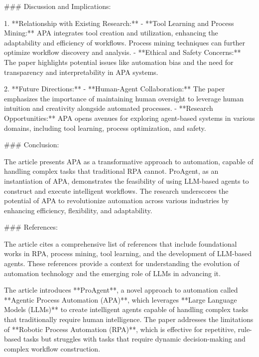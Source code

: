 ### Discussion and Implications:

1. **Relationship with Existing Research:**
   - **Tool Learning and Process Mining:** APA integrates tool creation and utilization, enhancing the adaptability and efficiency of workflows. Process mining techniques can further optimize workflow discovery and analysis.
   - **Ethical and Safety Concerns:** The paper highlights potential issues like automation bias and the need for transparency and interpretability in APA systems.

2. **Future Directions:**
   - **Human-Agent Collaboration:** The paper emphasizes the importance of maintaining human oversight to leverage human intuition and creativity alongside automated processes.
   - **Research Opportunities:** APA opens avenues for exploring agent-based systems in various domains, including tool learning, process optimization, and safety.

### Conclusion:

The article presents APA as a transformative approach to automation, capable of handling complex tasks that traditional RPA cannot. ProAgent, as an instantiation of APA, demonstrates the feasibility of using LLM-based agents to construct and execute intelligent workflows. The research underscores the potential of APA to revolutionize automation across various industries by enhancing efficiency, flexibility, and adaptability.

### References:

The article cites a comprehensive list of references that include foundational works in RPA, process mining, tool learning, and the development of LLM-based agents. These references provide a context for understanding the evolution of automation technology and the emerging role of LLMs in advancing it.



The article introduces **ProAgent**, a novel approach to automation called **Agentic Process Automation (APA)**, which leverages **Large Language Models (LLMs)** to create intelligent agents capable of handling complex tasks that traditionally require human intelligence. The paper addresses the limitations of **Robotic Process Automation (RPA)**, which is effective for repetitive, rule-based tasks but struggles with tasks that require dynamic decision-making and complex workflow construction.

